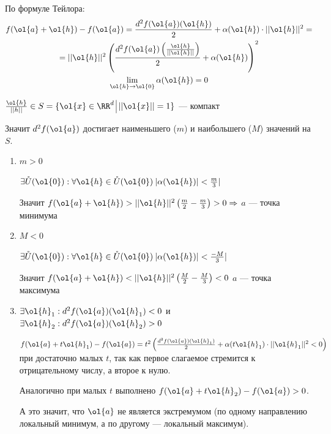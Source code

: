 По формуле Тейлора:
\begin{gather*}
    f(\ol{a} + \ol{h}) - f(\ol{a})
    =
    \frac{d^2 f(\ol{a}) (\ol{h})}{2} + \alpha (\ol{h}) \cdot || \ol{h} ||^2
    =
    \\
    =
    || \ol{h} ||^2 \left( \frac{ d^2 f(\ol{a}) \left( \frac{\ol{h}}{|| \ol{h} ||} \right) }{2} + \alpha (\ol{h}) \right)^2
    \\
    \lim\limits_{\ol{h} \to \ol{0}} \alpha (\ol{h}) = 0
\end{gather*}

\( \frac{\ol{h}}{ || h || } \in S = \{ \ol{x} \in \RR^d \: \vline \: || \ol{x} || = 1 \} \) --- компакт

Значит \( d^2 f ( \ol{a} ) \) достигает наименьшего (\( m \)) и наибольшего (\( M \)) значений на \( S \).

\begin{enumerate}
    \item
        \( m > 0 \)

        \( \exists \mathring{U} (\ol{0}) : \forall \ol{h} \in \mathring{U} (\ol{0}) \: | \alpha (\ol{h}) | < \frac{m}{3} | \)

        Значит \( f(\ol{a} + \ol{h}) > || \ol{h} ||^2 \left( \frac{m}{2} - \frac{m}{3} \right) > 0 \Rightarrow \) \( a \) --- точка минимума
    \item
        \( M < 0 \)

        \( \exists \mathring{U} (\ol{0}) : \forall \ol{h} \in \mathring{U} (\ol{0}) \: | \alpha (\ol{h}) | < \frac{-M}{3} | \)

        Значит \( f(\ol{a} + \ol{h}) < || \ol{h} ||^2 \left( \frac{M}{2} - \frac{M}{3} \right) < 0 \) \( a \) --- точка максимума
    \item
        \( \exists \ol{h}_1 : d^2 f(\ol{a}) (\ol{h}_1) < 0 \)
        и \( \exists \ol{h}_2 : d^2 f(\ol{a}) (\ol{h}_2) > 0 \)

        \(
            f(\ol{a} + t \ol{h}_1) - f(\ol{a})
            =
            t^2 \left( \frac{d^2 f (\ol{a}) (\ol{h}_1)}{2} + \alpha (t \ol{h}_1) \cdot || \ol{h}_1 ||^2 < 0 \right)
        \)
        при достаточно малых \( t \),
        так как первое слагаемое стремится к отрицательному числу, а второе к нулю.

        Аналогично при малых \( t \) выполнено \( f(\ol{a} + t \ol{h}_2) - f(\ol{a}) > 0 \).

        А это значит, что \( \ol{a} \) не является экстремумом (по одному направлению локальный минимум, а по другому --- локальный максимум).
\end{enumerate}

